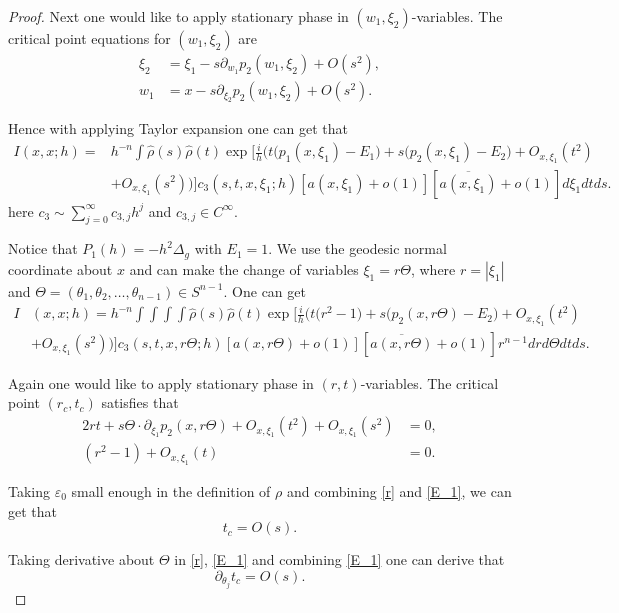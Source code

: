 \documentclass[12pt,reqno]{amsart}
\renewcommand{\epsilon}{\varepsilon}
\numberwithin{equation}{section}
\begin{document}
\begin{proof}
Next one would like to apply stationary phase in $(w_1, \xi_2)$-variables. The critical point equations for $(w_1, \xi_2)$ are
\begin{align}
\xi_2&=\xi_1-s\partial_{w_1} p_2(w_1,\xi_2)+ O(s^2), \\
w_1&=x-s\partial_{\xi_2} p_2(w_1,\xi_2)+ O(s^2).
\end{align}

Hence with applying Taylor expansion one can get that
\begin{align*}
I (x,x; h)=&h^{-n}\int \hat{\rho}(s) \hat{\rho}(t)  \exp\Big[\frac{i}h\Big(  t(p_1(x,\xi_1)-E_1\big)+s\big(p_2(x,\xi_1)-E_2\big)+O_{x,\xi_1}(t^2)  \nonumber \\
&+O_{x,\xi_1}(s^2) \Big)\Big]  c_3(s,t,x,\xi_1;h) [a(x, \xi_1)+o(1)] [\overline{a(x, \xi_1)}+o(1)]  d\xi_1 dt ds.
\end{align*}
here $c_3\sim \sum_{j=0}^\infty c_{3,j} h^j$ and $c_{3,j}\in C^\infty$.


Notice that $P_1(h)=-h^2\Delta_g$ with $E_1=1$. We use the geodesic normal coordinate about $x$ and can make the change of variables $\xi_1=r\Theta$, where $r=|\xi_1|$ and $\Theta=(\theta_1,\theta_2,\dots,\theta_{n-1})\in S^{n-1}$. One can get
\begin{align}\label{tilde I}
I &(x, x; h)= h^{-n}\int\int\int\int \hat{\rho}(s) \hat{\rho}(t)  \exp\Big[\frac{i}h\Big( t (r^2-1\big)+s\big(p_2(x, r\Theta)-E_2\big)+O_{x,\xi_1}(t^2) \nonumber\\ 
&+O_{x,\xi_1}(s^2) \Big)\Big]c_3(s,t, x,r\Theta;h)[a(x, r\Theta)+o(1)] [\overline{a(x, r\Theta)}+o(1)] r^{n-1} dr d\Theta dt ds.
\end{align}

Again one would like to apply stationary phase in $(r, t)$-variables. The critical point $(r_c,t_c)$ satisfies that
\begin{align}
2r t  +s\Theta\cdot \partial_{\xi_1} p_2(x, r\Theta)+O_{x,\xi_1}(t^2)+O_{x,\xi_1}(s^2)&=0, \label{r}\\
(r^2-1)+O_{x,\xi_1}(t)&=0. \label{E_1}
\end{align}

Taking $\epsilon_0$ small enough in the definition of $\rho$ and combining \eqref{r} and \eqref{E_1}, we can get that
\begin{equation}\label{t_c}
t_c=O(s).
\end{equation}


Taking derivative about $\Theta$ in \eqref{r}, \eqref{E_1} and combining \eqref{E_1} one can derive that
\begin{equation}\label{d t_c}
\partial_{\theta_j} t_c =O(s).
\end{equation}


\end{proof}
\end{document}
